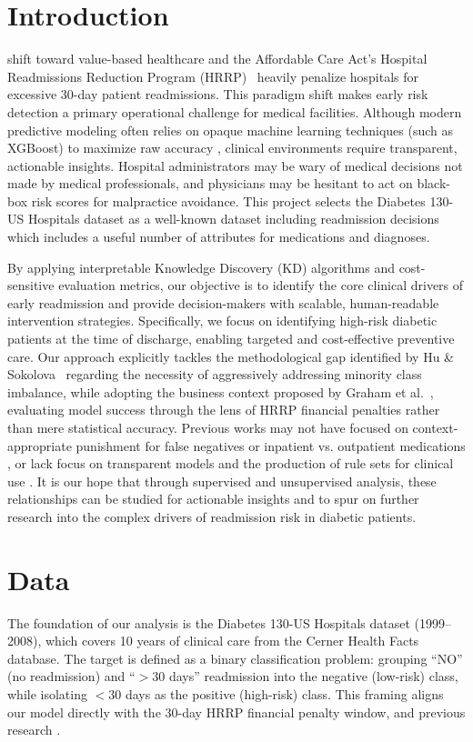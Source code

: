\documentclass[journal,onecolumn]{IEEEtran}
\begin{document}
\section{Introduction}
 shift toward value-based healthcare and the Affordable Care Act's Hospital Readmissions Reduction Program (HRRP)~\cite{strack_impact_2014} heavily penalize hospitals for excessive 30-day patient readmissions. This paradigm shift makes early risk detection a primary operational challenge for medical facilities. Although modern predictive modeling often relies on opaque machine learning techniques (such as XGBoost) to maximize raw accuracy \cite{emi-johnson_predicting_2025}, clinical environments require transparent, actionable insights. Hospital administrators may be wary of medical decisions not made by medical professionals, and physicians may be hesitant to act on black-box risk scores for malpractice avoidance. This project selects the Diabetes 130-US Hospitals dataset \cite{uci_diabetes_2014} as a well-known dataset including readmission decisions which includes a useful number of attributes for medications and diagnoses.

By applying interpretable Knowledge Discovery (KD) algorithms and cost-sensitive evaluation metrics, our objective is to identify the core clinical drivers of early readmission and provide decision-makers with scalable, human-readable intervention strategies. Specifically, we focus on identifying high-risk diabetic patients at the time of discharge, enabling targeted and cost-effective preventive care. Our approach explicitly tackles the methodological gap identified by Hu \& Sokolova~\cite{hu_explainable_2020} regarding the necessity of aggressively addressing minority class imbalance, while adopting the business context proposed by Graham et al.~\cite{graham_identifying_2019}, evaluating model success through the lens of HRRP financial penalties rather than mere statistical accuracy. Previous works may not have focused on context-appropriate punishment for false negatives or inpatient vs. outpatient medications \cite{rubin_correction_2018}, or lack focus on transparent models and the production of rule sets for clinical use \cite{liu_comparison_2024}. It is our hope that through supervised and unsupervised analysis, these relationships can be studied for actionable insights and to spur on further research into the complex drivers of readmission risk in diabetic patients.

\section{Data}
The foundation of our analysis is the Diabetes 130-US Hospitals dataset (1999–2008), which covers 10 years of clinical care from the Cerner Health Facts database. The target is defined as a binary classification problem: grouping ``NO'' (no readmission) and ``$>$30 days'' readmission into the negative (low-risk) class, while isolating $<30$ days as the positive (high-risk) class. This framing aligns our model directly with the 30-day HRRP financial penalty window, and previous research \cite{strack_impact_2014}.
\end{document}
